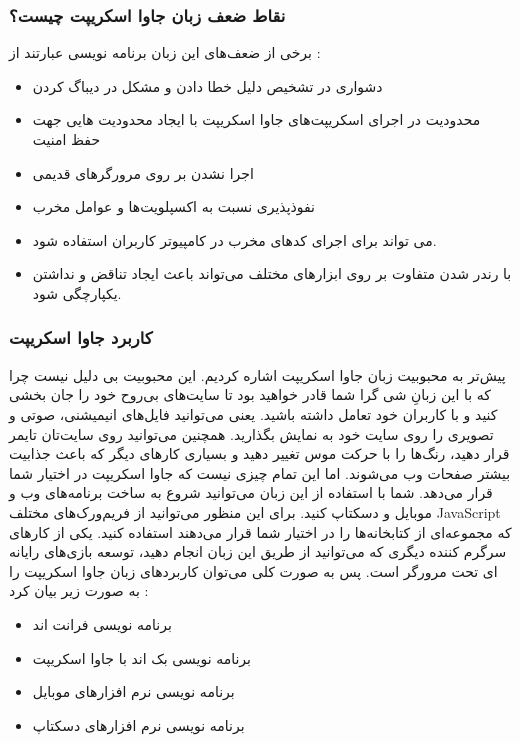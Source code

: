 \subsubsection{نقاط ضعف زبان جاوا اسکریپت چیست؟}
 برخی از ضعف‌های این زبان برنامه نویسی عبارتند از :
\begin{itemize}
	\item
دشواری در تشخیص دلیل خطا دادن و مشکل در دیباگ کردن
\item
محدودیت در اجرای اسکریپت‌های جاوا اسکریپت با ایجاد محدودیت هایی جهت حفظ امنیت
\item
اجرا نشدن بر روی مرورگرهای قدیمی
\item
نفوذپذیری نسبت به اکسپلویت‌ها و عوامل مخرب
\item
می تواند برای اجرای کدهای مخرب در کامپیوتر کاربران استفاده شود.
\item
با رندر شدن متفاوت بر روی ابزارهای مختلف می‌تواند باعث ایجاد تناقض و نداشتن یکپارچگی شود.
\end{itemize}

\subsubsection{کاربرد جاوا اسکریپت}
پیش‌تر به محبوبیت زبان جاوا اسکریپت اشاره کردیم. این محبوبیت بی دلیل نیست چرا که با این زبانِ شی گرا شما قادر خواهید بود تا سایت‌های بی‌روح خود را جان بخشی کنید و با کاربران خود تعامل داشته باشید. یعنی می‌توانید فایل‌های انیمیشنی، صوتی و تصویری را روی سایت خود به نمایش بگذارید. همچنین می‌توانید روی سایت‌تان تایمر قرار دهید، رنگ‌ها را با حرکت موس تغییر دهید و بسیاری کارهای دیگر که باعث جذابیت بیشتر صفحات وب می‌شوند.
اما این تمام چیزی نیست که جاوا اسکریپت در اختیار شما قرار می‌دهد. شما با استفاده از این زبان می‌توانید شروع به ساخت برنامه‌های وب و موبایل و دسکتاپ کنید. برای این منظور می‌توانید از فریم‌ورک‌های مختلف JavaScript که مجموعه‌ای از کتابخانه‌ها را در اختیار شما قرار می‌دهند استفاده کنید. یکی از کارهای سرگرم کننده دیگری که می‌توانید از طریق این زبان انجام دهید، توسعه بازی‌های رایانه ای تحت مرورگر است.  پس به صورت کلی می‌توان کاربردهای زبان جاوا اسکریپت را به صورت زیر بیان کرد :
\begin{itemize}
	\item
برنامه نویسی فرانت اند
\item
برنامه نویسی بک اند با جاوا اسکریپت
\item
برنامه نویسی نرم افزارهای موبایل
\item
برنامه نویسی نرم افزارهای دسکتاپ

\end{itemize}

